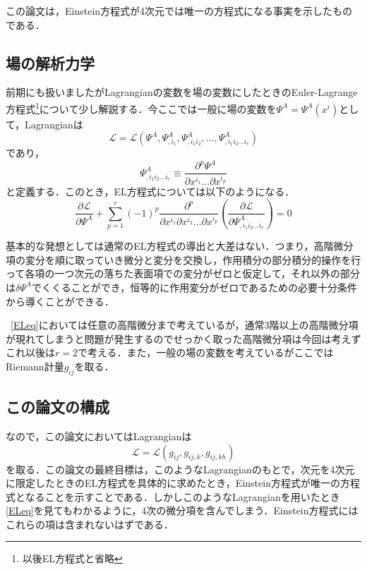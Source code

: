 \documentclass[main]{subfiles}
\begin{document}
この論文は，Einstein方程式が4次元では唯一の方程式になる事実を示したものである．

\subsection{場の解析力学}
前期にも扱いましたがLagrangianの変数を場の変数にしたときのEuler-Lagrange方程式\footnote{以後EL方程式と省略}について少し解説する．今ここでは一般に場の変数を\(\Psi^A = \Psi^A(x^i)\)として，Lagrangianは
\begin{equation*}
    \mathscr{L} = \mathscr{L}( \Psi ^A, \Psi ^A _{,i_1}, \Psi ^A _{,i_1 i_2}, \dots , \Psi ^A _{,i_1 i_2 \dots i_r})
\end{equation*}
であり，
\begin{equation*}
    \Psi ^A _{,i_1 i_2 \dots i_r} \equiv \dfrac{\partial ^p \Psi^A}{\partial x^{i_1} \dots \partial x^{i_p}}
\end{equation*}
と定義する．このとき，EL方程式については以下のようになる．
\begin{equation*}
    \dfrac{\partial \mathscr{L}}{\partial \Psi^A} + \sum ^r _{p=1} {(-1)}^p \dfrac{\partial ^p}{\partial x^{i_1}\partial x^{i_2} \dots \partial x^{i_p}}\left( \dfrac{\partial \mathscr{L}}{\partial \Psi ^A _{,i_1 i_2 \dots i_r}} \right) =0 \tag{1.2} \label{ELeq}
\end{equation*}

基本的な発想としては通常のEL方程式の導出と大差はない．つまり，高階微分項の変分を順に取っていき微分と変分を交換し，作用積分の部分積分的操作を行って各項の一つ次元の落ちた表面項での変分がゼロと仮定して，それ以外の部分は\(\delta \Psi ^A\)でくくることができ，恒等的に作用変分がゼロであるための必要十分条件から導くことができる．

~\eqref{ELeq}においては任意の高階微分まで考えているが，通常3階以上の高階微分項が現れてしまうと問題が発生するのでせっかく取った高階微分項は今回は考えずこれ以後は\(r=2\)で考える．また，一般の場の変数を考えているがここではRiemann計量\(g_{ij}\)を取る．

\subsection{この論文の構成}
なので，この論文においてはLagrangianは
\begin{equation}
    \mathscr{L} = \mathscr{L}(g_{ij}, g_{ij,k}, g_{ij,kh})
    \tag{1.3} \label{lag1}
\end{equation}
を取る．この論文の最終目標は，このようなLagrangianのもとで，次元を4次元に限定したときのEL方程式を具体的に求めたとき，Einstein方程式が唯一の方程式となることを示すことである．しかしこのようなLagrangianを用いたとき\eqref{ELeq}を見てもわかるように，4次の微分項を含んでしまう．Einstein方程式にはこれらの項は含まれないはずである．
\end{document}
